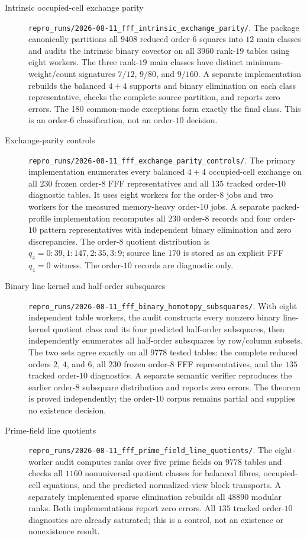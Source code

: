 \begin{description}
\item[Intrinsic occupied-cell exchange parity]
\nolinkurl{repro_runs/2026-08-11_fff_intrinsic_exchange_parity/}.
The package canonically partitions all $9408$ reduced order-$6$ squares into
$12$ main classes and audits the intrinsic binary covector on all $3960$
rank-$19$ tables using eight workers.  The three rank-$19$ main classes have
distinct minimum-weight/count signatures $7/12$, $9/80$, and $9/160$.  A
separate implementation rebuilds the balanced $4+4$ supports and binary
elimination on each class representative, checks the complete source
partition, and reports zero errors.  The 180 common-mode exceptions form
exactly the final class.  This is an order-$6$ classification, not an
order-$10$ decision.

\item[Exchange-parity controls]
\nolinkurl{repro_runs/2026-08-11_fff_exchange_parity_controls/}.
The primary implementation enumerates every balanced $4+4$ occupied-cell
exchange on all $230$ frozen order-$8$ FFF representatives and all $135$
tracked order-$10$ diagnostic tables.  It uses eight workers for the
order-$8$ jobs and two workers for the measured memory-heavy order-$10$ jobs.
A separate packed-profile implementation recomputes all $230$ order-$8$
records and four order-$10$ pattern representatives with independent binary
elimination and zero discrepancies.  The order-$8$ quotient distribution is
$q_4=0:39,1:147,2:35,3:9$; source line $170$ is stored as an explicit FFF
$q_4=0$ witness.  The order-$10$ records are diagnostic only.

\item[Binary line kernel and half-order subsquares]
\nolinkurl{repro_runs/2026-08-11_fff_binary_homotopy_subsquares/}.
With eight independent table workers, the audit constructs every nonzero
binary line-kernel quotient class and its four predicted half-order
subsquares, then independently enumerates all half-order subsquares by
row/column subsets.  The two sets agree exactly on all $9778$ tested tables:
the complete reduced orders $2$, $4$, and $6$, all $230$ frozen order-$8$
FFF representatives, and the $135$ tracked order-$10$ diagnostics.  A
separate semantic verifier reproduces the earlier order-$8$ subsquare
distribution and reports zero errors.  The theorem is proved independently;
the order-$10$ corpus remains partial and supplies no existence decision.

\item[Prime-field line quotients]
\nolinkurl{repro_runs/2026-08-11_fff_prime_field_line_quotients/}.
The eight-worker audit computes ranks over five prime fields on $9778$
tables and checks all $1160$ nonuniversal quotient classes for balanced
fibres, occupied-cell equations, and the predicted normalized-view block
transports.  A separately implemented sparse elimination rebuilds all
$48890$ modular ranks.  Both implementations report zero errors.  All $135$
tracked order-$10$ diagnostics are already saturated; this is a control, not
an existence or nonexistence result.


\end{description}
